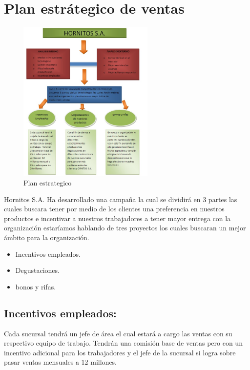 \section{Plan estr\'ategico de ventas}
\begin{figure}[htbp]
	\centering
		\includegraphics[width=0.60\textwidth]{images/Dibujo.jpg}
	\caption{Plan estrategico}
	\label{fig:Plan estrategico}
\end{figure}%
Hornitos S.A. Ha desarrollado una campa\~na la cual se dividir\'a en 3 partes las cuales buscara tener  por medio de los clientes una preferencia en nuestros productos e incentivar a nuestros trabajadores a tener mayor entrega con la organizaci\'on estar\'iamos hablando de tres proyectos los cuales buscaran un mejor \'ambito para la organizaci\'on.%
\\%
	\begin{itemize}
		\item Incentivos empleados.
		\item Degustaciones.
		\item bonos y rifas.
	\end{itemize}
\subsection{Incentivos empleados:}Cada sucursal tendr\'a un jefe de \'area el cual estar\'a a cargo las ventas con su  respectivo equipo de trabajo.  Tendr\'an una comisi\'on base de ventas pero con un incentivo adicional para los trabajadores y el jefe de la sucursal si logra sobre pasar ventas mensuales a 12 millones.%
